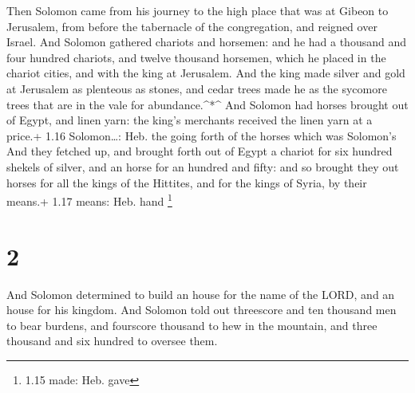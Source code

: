  Then Solomon came from his journey to the high place that
was at Gibeon to Jerusalem, from before the tabernacle of the
congregation, and reigned over Israel.  And Solomon
gathered chariots and horsemen: and he had a thousand and four hundred
chariots, and twelve thousand horsemen, which he placed in the chariot
cities, and with the king at Jerusalem.  And the king made
silver and gold at Jerusalem as plenteous as stones, and cedar trees
made he as the sycomore trees that are in the vale for
abundance.\^{}*\^{}  And Solomon had horses brought out of
Egypt, and linen yarn: the king's merchants received the linen yarn at a
price.+ 1.16 Solomon\ldots: Heb. the going forth of the horses which was
Solomon's  And they fetched up, and brought forth out of
Egypt a chariot for six hundred shekels of silver, and an horse for an
hundred and fifty: and so brought they out horses for all the kings of
the Hittites, and for the kings of Syria, by their means.+ 1.17 means:
Heb. hand \footnote{1.15 made: Heb. gave}

\hypertarget{section-1}{%
\section{2}\label{section-1}}

 And Solomon determined to build an house for the name of
the LORD, and an house for his kingdom.  And Solomon told
out threescore and ten thousand men to bear burdens, and fourscore
thousand to hew in the mountain, and three thousand and six hundred to
oversee them.

